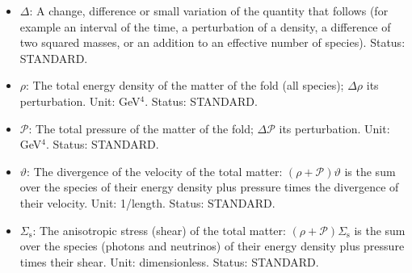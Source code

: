 \documentclass[
  10pt,
]{article}
\begin{document}
\begin{itemize}
  gravity of our world, on the fold),
  \(G_{\mathrm{N}} = 1/M_{\mathrm{Pl}}^2\) with the Planck mass
  \(M_{\mathrm{Pl}} = 1.221\times10^{19}\) GeV. Unit: GeV\(^{-2}\).
  Value: \(6.708\times10^{-39}\) GeV\(^{-2}\). Status: STANDARD.
\item
  \(\Delta\): A change, difference or small variation of the quantity
  that follows (for example an interval of the time, a perturbation of a
  density, a difference of two squared masses, or an addition to an
  effective number of species). Status: STANDARD.
\item
  \(\rho\): The total energy density of the matter of the fold (all
  species); \(\Delta\rho\) its perturbation. Unit: GeV\(^4\). Status:
  STANDARD.
\item
  \(\mathcal{P}\): The total pressure of the matter of the fold;
  \(\Delta\mathcal{P}\) its perturbation. Unit: GeV\(^4\). Status:
  STANDARD.
\item
  \(\vartheta\): The divergence of the velocity of the total matter:
  \((\rho + \mathcal{P})\vartheta\) is the sum over the species of their
  energy density plus pressure times the divergence of their velocity.
  Unit: 1/length. Status: STANDARD.
\item
  \(\Sigma_{\mathrm{s}}\): The anisotropic stress (shear) of the total
  matter: \((\rho + \mathcal{P})\Sigma_{\mathrm{s}}\) is the sum over
  the species (photons and neutrinos) of their energy density plus
  pressure times their shear. Unit: dimensionless. Status: STANDARD.
\end{itemize}
\end{document}
